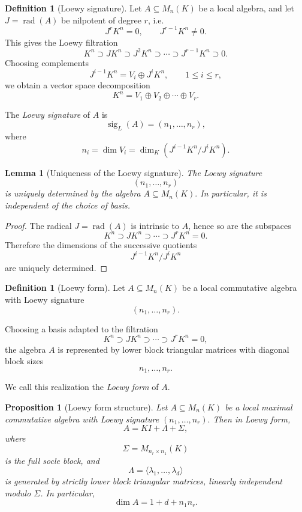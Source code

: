 \documentclass[11pt]{article}
\theoremstyle{remark}
\theoremstyle{plain}
\newtheorem{proposition}[theorem]{Proposition}
\newtheorem{lemma}[theorem]{Lemma}
\theoremstyle{definition}
\newtheorem{definition}[theorem]{Definition}
\theoremstyle{myremark}
\begin{document}
\begin{definition}[Loewy signature]
	Let $A\subseteq M_n(K)$ be a local algebra, and let
$J=\operatorname{rad}(A)$ be nilpotent of degree $r$, i.e.
	\[
	J^{r}K^n=0,	\qquad	J^{r-1}K^n\neq0.	\]	
	This gives the Loewy filtration
	\[
	K^n	\supset	JK^n\supset	J^2K^n	\supset	\cdots	\supset	J^{r-1}K^n	\supset	0.
	\]	
	Choosing complements
	\[
	J^{i-1}K^n	=	V_i\oplus J^iK^n,	\qquad	1\le i\le r,
	\]
	we obtain a vector space decomposition
	\[
	K^n	= 	V_1\oplus V_2\oplus\cdots\oplus V_r.
	\]
	
	The \emph{Loewy signature} of \(A\) is
	\[
	\operatorname{sig}_L(A)	=	(n_1,\dots,n_r),
	\]
	where
	\[
	n_i=\dim V_i	=	\dim_K\!\left(J^{i-1}K^n/J^iK^n\right).
	\]
\end{definition}\medskip

\begin{lemma}[Uniqueness of the Loewy signature]
	The Loewy signature 
	\[
	(n_1,\dots,n_r)
	\]
	is uniquely determined by the algebra
	$A\subseteq M_n(K).$
	In particular, it is independent of the choice of basis.
\end{lemma}

\begin{proof}
	The radical $J=\operatorname{rad}(A)$ is intrinsic to \(A\), hence so are the subspaces
	\[
	K^n\supset JK^n\supset\cdots\supset J^rK^n=0.
	\]
	Therefore the dimensions of the successive quotients
	\[
	J^{i-1}K^n/J^iK^n
	\]
	are uniquely determined.
\end{proof}

\begin{definition}[Loewy form]
	Let $A\subseteq M_n(K)$
	be a local commutative algebra with Loewy signature
	\[
	(n_1,\dots,n_r).
	\]
	
	Choosing a basis adapted to the filtration
	\[
	K^n\supset JK^n\supset\cdots\supset J^rK^n=0,
	\]
	the algebra \(A\) is represented by lower block triangular matrices with
	diagonal block sizes
	\[
	n_1,\dots,n_r.
	\]
	
	We call this realization the \emph{Loewy form} of \(A\).
\end{definition}\medskip
\begin{proposition}[Loewy form structure]
	Let \(A\subseteq M_n(K)\) be a local maximal commutative algebra with Loewy signature
	$(n_1,\dots,n_r).$
	Then in Loewy form,
	\begin{equation}\label{Loewyeq}
	A=KI+\Lambda+\Sigma,
	\end{equation}
	where
	\[	\Sigma=M_{n_r\times n_1}(K)	\]
	is the full socle block, and
	\[	\Lambda=\langle \lambda_1,\dots,\lambda_d\rangle	\]
	is generated by strictly lower block triangular matrices, linearly independent modulo \(\Sigma\). In particular,
	\[
	\dim A=1+d+n_1n_r.
	\]
\end{proposition}
\end{document}

